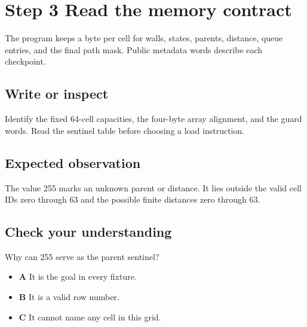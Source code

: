 \section{Step 3 Read the memory contract}\label{maze-s03}

The program keeps a byte per cell for walls, states, parents, distance, queue entries, and the final path mask. Public metadata words describe each checkpoint.

\subsection{Write or inspect}

Identify the fixed 64-cell capacities, the four-byte array alignment, and the guard words. Read the sentinel table before choosing a load instruction.

\subsection{Expected observation}

The value 255 marks an unknown parent or distance. It lies outside the valid cell IDs zero through 63 and the possible finite distances zero through 63.

\subsection{Check your understanding}

Why can 255 serve as the parent sentinel?

\begin{itemize}
  \item \textbf{A} It is the goal in every fixture.
  \item \textbf{B} It is a valid row number.
  \item \textbf{C} It cannot name any cell in this grid.
\end{itemize}
